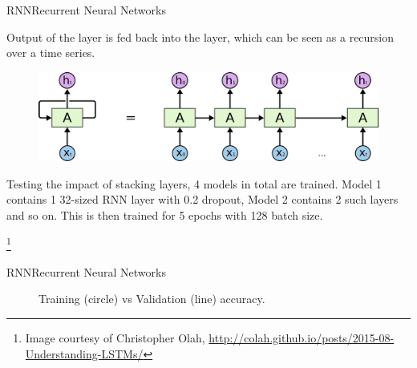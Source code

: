 \documentclass{beamer}
\newlength\figureheight
\newlength\figurewidth
\newcommand\blfootnote[1]{%
	\begingroup
	\renewcommand\thefootnote{}\footnote{#1}%
	\addtocounter{footnote}{-1}%
	\endgroup
}
\begin{document}
\begin{frame}{RNN}{Recurrent Neural Networks}

	Output of the layer is fed back into the layer, which can be seen as a recursion over a time series.

	\begin{figure}
		\centering
		\includegraphics[width=0.7\linewidth]{graphics/RNN-unrolled.png}
	\end{figure}

	Testing the impact of stacking layers, 4 models in total are trained. Model 1 contains 1 32-sized RNN layer with 0.2 dropout, Model 2 contains 2 such layers and so on. This is then trained for 5 epochs with 128 batch size. 


\blfootnote{\tiny Image courtesy of Christopher Olah, \url{http://colah.github.io/posts/2015-08-Understanding-LSTMs/}}
  
\end{frame}

\begin{frame}{RNN}{Recurrent Neural Networks}
	\begin{figure}
	\centering

	\setlength\figureheight{3cm}
	\setlength{}
	
	
	\caption{Training (circle) vs Validation (line) accuracy.} 
	\end{figure}
\end{frame}
\end{document}
